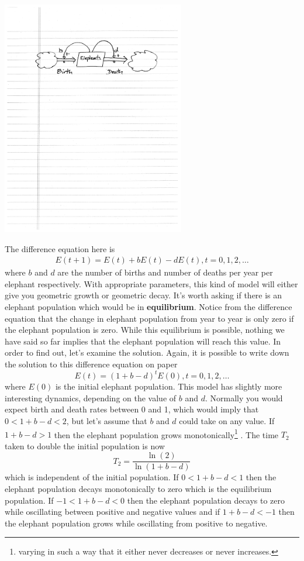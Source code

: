 \documentclass{tufte-handout}
\begin{document}
\centerline{\includegraphics[width=8cm]{figs/first_order_model}}

The difference equation here is
\begin{eqnarray*}
E(t+1) = E(t) + bE(t) - dE(t), t = 0,1,2,\ldots
\end{eqnarray*}
where $b$ and $d$ are the number of births and number of deaths per year per elephant respectively. With appropriate parameters, this kind of model will either give you geometric growth or geometric decay. It's worth asking if there is an elephant population which would be in {\bf equilibrium}. Notice from the difference equation that the change in elephant population from year to year is only zero if the elephant population is zero. While this equilibrium is possible, nothing we have said so far implies that the elephant population will reach this value. In order to find out, let's examine the solution. Again, it is possible to write down the solution to this difference equation on paper
$$E(t) = (1+b-d)^t E(0), t = 0,1,2,\ldots $$
where $E(0)$ is the initial elephant population. This model has slightly more interesting dynamics, depending on the value of $b$ and $d$. Normally you would expect birth and death rates between 0 and 1, which would imply that $0<1+b-d<2$, but let's assume that $b$ and $d$ could take on any value. If $1+b-d > 1$ then the elephant population grows monotonically\footnote{varying in such a way that it either never decreases or never increases.}
. The time $T_2$ taken to double the initial population is now
$$ T_2 = \frac{\ln(2)}{\ln(1+b-d)} $$
which is independent of the initial population. If $0 < 1+b-d < 1$ then the elephant population decays monotonically to zero which is the equilibrium population. If $-1 < 1+b-d<0$ then the elephant population decays to zero while oscillating between positive and negative values and if $1+b-d < -1$ then the elephant population grows while oscillating from positive to negative.
\end{document}
